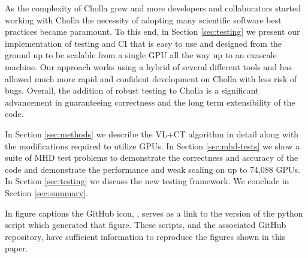 As the complexity of Cholla grew and more developers and collaborators started working with Cholla the necessity of adopting many scientific software best practices became paramount. To this end, in Section \ref{sec:testing} we present our implementation of testing and CI that is easy to use and designed from the ground up to be scalable from a single GPU all the way up to an exascale machine. Our approach works using a hybrid of several different tools and has allowed much more rapid and confident development on Cholla with less risk of bugs. Overall, the addition of robust testing to Cholla is a significant advancement in guaranteeing correctness and the long term extensibility of the code.

In Section \ref{sec:methods} we describe the VL+CT algorithm in detail along with the modifications required to utilize GPUs. 
In Section \ref{sec:mhd-tests} we show a suite of MHD test problems to demonstrate the correctness and accuracy of the code and demonstrate the performance and weak scaling on up to 74,088 GPUs.
In Section \ref{sec:testing} we discuss the new testing framework. 
We conclude in Section \ref{sec:summary}. 

In figure captions the GitHub icon, , serves as a link to the version of the python script which generated that figure. These scripts, and the associated GitHub repository, have sufficient information to reproduce the figures shown in this paper.